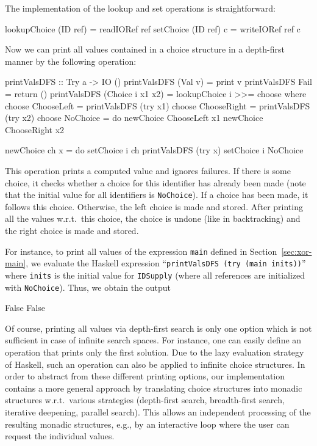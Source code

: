 \documentclass{llncs}
\newcommand{\code}[1]{\mbox{\small\texttt{#1}}}
\newcommand{\ccode}[1]{``\code{#1}''}
\begin{document}
The implementation of the lookup and set operations is straightforward:
\begin{haskell}
  lookupChoice (ID ref) = readIORef ref
  setChoice (ID ref) c = writeIORef ref c
\end{haskell}
Now we can print all values contained in a choice structure
in a depth-first manner by the following operation:
\label{sec:printValsDFS}
\begin{haskell}
  printValsDFS :: Try a -> IO ()
  printValsDFS (Val v)          = print v
  printValsDFS Fail             = return ()
  printValsDFS (Choice i x1 x2) = lookupChoice i >>= choose
   where
    choose ChooseLeft  = printValsDFS (try x1)
    choose ChooseRight = printValsDFS (try x2)
    choose NoChoice    = do newChoice ChooseLeft  x1
                            newChoice ChooseRight x2
  
    newChoice ch x = do setChoice i ch
                        printValsDFS (try x)
                        setChoice i NoChoice
\end{haskell}
This operation prints a computed value and ignores failures.
If there is some choice, it checks whether a choice for
this identifier has already been made (note that the initial value
for all identifiers is \code{NoChoice}).
If a choice has been made, it follows this choice.
Otherwise, the left choice is made and stored. After printing
all the values w.r.t.\ this choice, the choice is undone (like in backtracking)
and the right choice is made and stored.

For instance, to print all values of the expression \code{main}
defined in Section~\ref{sec:xor-main},
we evaluate the Haskell expression \ccode{printValsDFS (try (main inits))}
where \code{inits} is the initial value for \code{IDSupply}
(where all references are initialized with \code{NoChoice}).
Thus, we obtain the output
\begin{haskell}
  False
  False
\end{haskell}
Of course, printing all values via depth-first search
is only one option which is not sufficient in case of infinite search
spaces. For instance, one can easily define an operation
that prints only the first solution. Due to the lazy evaluation
strategy of Haskell, such an operation can also be applied to
infinite choice structures.
In order to abstract from these different printing options,
our implementation contains a more general
approach by translating choice structures into monadic structures
w.r.t.\ various strategies (depth-first search, breadth-first search,
iterative deepening, parallel search).
This allows an independent processing of the resulting monadic structures,
e.g.,
by an interactive loop where the user can request the individual values.
\end{document}
